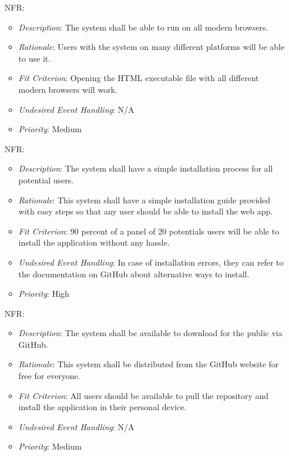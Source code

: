 \documentclass[12pt]{article}
\newcounter{nfrnum} %
\begin{document}
\begin{itemize}
\item[NFR\refstepcounter{nfrnum}\thenfrnum \label{NFR_15}:] 
\begin{itemize}
  \item \textit{Description}: The system shall be able to run on all modern browsers. 
  \item \textit{Rationale}: Users with the system on many different platforms will be able to use it. 
  \item \textit{Fit Criterion}: Opening the HTML executable file with all different modern browsers will work.
  \item \textit{Undesired Event Handling}: N/A
  \item \textit{Priority}: Medium
\end{itemize}

\item[NFR\refstepcounter{nfrnum}\thenfrnum \label{NFR_16}:] 
\begin{itemize}
  \item \textit{Description}: The system shall have a simple installation process for all potential users.
  \item \textit{Rationale}: This system shall have a simple installation guide provided with easy steps so that any user should be able to install the web app.
  \item \textit{Fit Criterion}: 90 percent of a panel of 20 potentials users will be able to install the application without any hassle.
  \item \textit{Undesired Event Handling}: In case of installation errors, they can refer to the documentation on GitHub about alternative ways to install.
  \item \textit{Priority}: High
\end{itemize}

\item[NFR\refstepcounter{nfrnum}\thenfrnum \label{NFR_17}:] 
\begin{itemize}
  \item \textit{Description}: The system shall be available to download for the public via GitHub.
  \item \textit{Rationale}: This system shall be distributed from the GitHub website for free for everyone.
  \item \textit{Fit Criterion}: All users should be available to pull the repository and install the application in their personal device.
  \item \textit{Undesired Event Handling}: N/A
  \item \textit{Priority}: Medium
\end{itemize}


\end{itemize}
\end{document}
